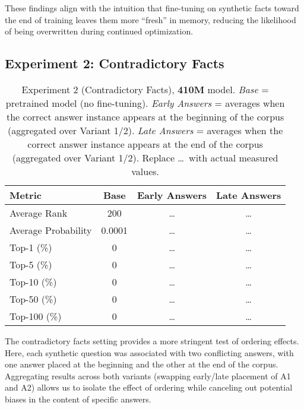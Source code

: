 \documentclass[11pt]{article}
\begin{document}
These findings align with the intuition that fine-tuning on synthetic facts toward the end of training leaves them more “fresh” in memory, reducing the likelihood of being overwritten during continued optimization.

\subsection{Experiment 2: Contradictory Facts}
\begin{table*}[htbp]
\centering
\small
\begin{tabular}{l|ccc}
\hline
\textbf{Metric} & \textbf{Base} & \textbf{Early Answers} & \textbf{Late Answers} \\
\hline
Average Rank            & 200      & \dots    & \dots    \\
Average Probability     & 0.0001   & \dots    & \dots    \\
Top-1 (\%)              & 0        & \dots    & \dots    \\
Top-5 (\%)              & 0        & \dots    & \dots    \\
Top-10 (\%)             & 0        & \dots    & \dots    \\
Top-50 (\%)             & 0        & \dots    & \dots    \\
Top-100 (\%)            & 0        & \dots    & \dots    \\
\hline
\end{tabular}
\caption{Experiment 2 (Contradictory Facts), \textbf{410M} model. 
\emph{Base} = pretrained model (no fine-tuning). 
\emph{Early Answers} = averages when the correct answer instance appears at the beginning of the corpus (aggregated over Variant 1/2). 
\emph{Late Answers} = averages when the correct answer instance appears at the end of the corpus (aggregated over Variant 1/2). 
Replace \dots\ with actual measured values.}
\label{tab:contradict-410m}
\end{table*}

The contradictory facts setting provides a more stringent test of ordering effects. Here, each synthetic question was associated with two conflicting answers, with one answer placed at the beginning and the other at the end of the corpus. Aggregating results across both variants (swapping early/late placement of A1 and A2) allows us to isolate the effect of ordering while canceling out potential biases in the content of specific answers.
\end{document}
